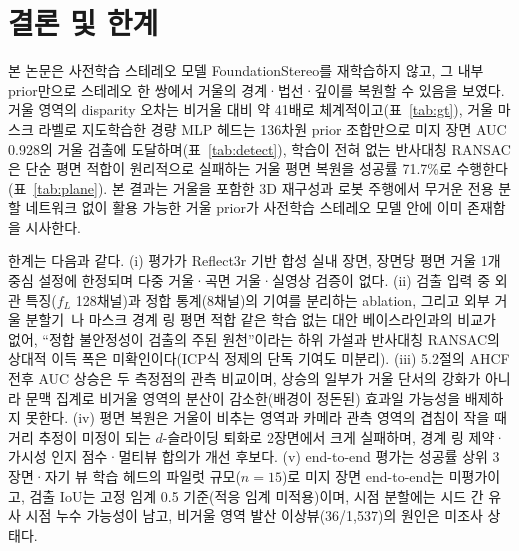\documentclass[twocolumn,10pt,a4paper]{article}
\begin{document}
\section{결론 및 한계}

본 논문은 사전학습 스테레오 모델 FoundationStereo를 재학습하지 않고, 그 내부 prior만으로 스테레오 한 쌍에서 거울의 경계·법선·깊이를 복원할 수 있음을 보였다. 거울 영역의 disparity 오차는 비거울 대비 약 41배로 체계적이고(표~\ref{tab:gt}), 거울 마스크 라벨로 지도학습한 경량 MLP 헤드는 136차원 prior 조합만으로 미지 장면 AUC 0.928의 거울 검출에 도달하며(표~\ref{tab:detect}), 학습이 전혀 없는 반사대칭 RANSAC은 단순 평면 적합이 원리적으로 실패하는 거울 평면 복원을 성공률 71.7\%로 수행한다(표~\ref{tab:plane}). 본 결과는 거울을 포함한 3D 재구성과 로봇 주행에서 무거운 전용 분할 네트워크 없이 활용 가능한 거울 prior가 사전학습 스테레오 모델 안에 이미 존재함을 시사한다.

한계는 다음과 같다. (i) 평가가 Reflect3r 기반 합성 실내 장면, 장면당 평면 거울 1개 중심 설정에 한정되며 다중 거울·곡면 거울·실영상 검증이 없다. (ii) 검출 입력 중 외관 특징($f_L$ 128채널)과 정합 통계(8채널)의 기여를 분리하는 ablation, 그리고 외부 거울 분할기~\cite{yang2019mirrornet,lin2020pmd}나 마스크 경계 링 평면 적합 같은 학습 없는 대안 베이스라인과의 비교가 없어, ``정합 불안정성이 검출의 주된 원천''이라는 하위 가설과 반사대칭 RANSAC의 상대적 이득 폭은 미확인이다(ICP식 정제의 단독 기여도 미분리). (iii) 5.2절의 AHCF 전후 AUC 상승은 두 측정점의 관측 비교이며, 상승의 일부가 거울 단서의 강화가 아니라 문맥 집계로 비거울 영역의 분산이 감소한(배경이 정돈된) 효과일 가능성을 배제하지 못한다. (iv) 평면 복원은 거울이 비추는 영역과 카메라 관측 영역의 겹침이 작을 때 거리 추정이 미정이 되는 $d$-슬라이딩 퇴화로 2장면에서 크게 실패하며, 경계 링 제약·가시성 인지 점수·멀티뷰 합의가 개선 후보다. (v) end-to-end 평가는 성공률 상위 3장면·자기 뷰 학습 헤드의 파일럿 규모($n{=}15$)로 미지 장면 end-to-end는 미평가이고, 검출 IoU는 고정 임계 0.5 기준(적응 임계 미적용)이며, 시점 분할에는 시드 간 유사 시점 누수 가능성이 남고, 비거울 영역 발산 이상뷰(36/1,537)의 원인은 미조사 상태다.
\end{document}
